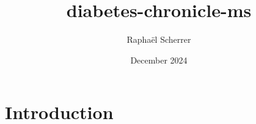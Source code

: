 \documentclass{article}
\title{diabetes-chronicle-ms}
\author{Raphaël Scherrer}
\date{December 2024}
\begin{document}
\maketitle

\section{Introduction}
\end{document}
